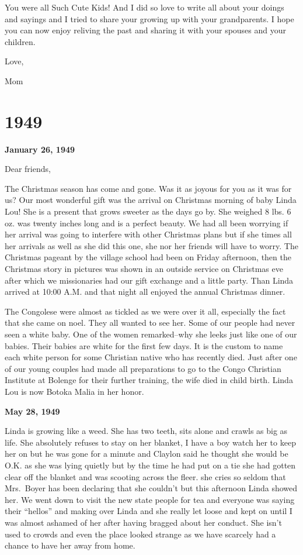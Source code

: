 \documentclass[]{book}
\begin{document}
You were all Such Cute Kids! And I did so love to write all about your doings and sayings and I tried to share your growing up with your grandparents. I hope you can now enjoy reliving the past and sharing it with your spouses and your children.

Love,

Mom

\hypertarget{section}{%
\chapter{1949}\label{section}}

\textbf{January 26, 1949}

Dear friends,

The Christmas season has come and gone. Was it as joyous for you as it was for us? Our most wonderful gift was the arrival on Christmas morning of baby Linda Lou! She is a present that grows sweeter as the days go by. She weighed 8 lbs. 6 oz. was twenty inches long and is a perfect beauty. We had all been worrying if her arrival was going to interfere with other Christmas plans but if she times all her arrivals as well as she did this one, she nor her friends will have to worry. The Christmas pageant by the village school had been on Friday afternoon, then the Christmas story in pictures was shown in an outside service on Christmas eve after which we missionaries had our gift exchange and a little party. Than Linda arrived at 10:00 A.M. and that night all enjoyed the annual Christmas dinner.

The Congolese were almost as tickled as we were over it all, especially the fact that she came on noel. They all wanted to see her. Some of our people had never seen a white baby. One of the women remarked--why she leeks just like one of our babies. Their babies are white for the first few days. It is the custom to name each white person for some Christian native who has recently died. Just after one of our young couples had made all preparations to go to the Congo Christian Institute at Bolenge for their further training, the wife died in child birth. Linda Lou is now Botoka Malia in her honor.

\textbf{May 28, 1949}

Linda is growing like a weed. She has two teeth, sits alone and crawls as big as life. She absolutely refuses to stay on her blanket, I have a boy watch her to keep her on but he was gone for a minute and Claylon said he thought she would be O.K. as she was lying quietly but by the time he had put on a tie she
had gotten clear off the blanket and was scooting across the fleer. she cries so seldom that Mrs.~Boyer has been declaring that she couldn't but this afternoon Linda showed her. We went down to visit the new state people for tea and everyone was saying their ``hellos'' and making over Linda and she really let loose and kept on until I was almost ashamed of her after having bragged about her conduct. She isn't used to crowds and even the place looked strange as we have scarcely had a chance to have her away from home.
\end{document}

